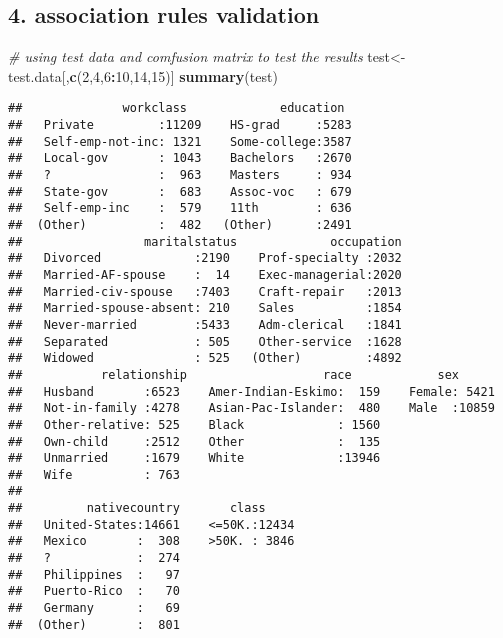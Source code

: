 \documentclass[]{article}
\newenvironment{Shaded}{\begin{snugshade}}{\end{snugshade}}
\newcommand{\KeywordTok}[1]{\textcolor[rgb]{0.13,0.29,0.53}{\textbf{#1}}}
\newcommand{\DecValTok}[1]{\textcolor[rgb]{0.00,0.00,0.81}{#1}}
\newcommand{\CommentTok}[1]{\textcolor[rgb]{0.56,0.35,0.01}{\textit{#1}}}
\newcommand{\OperatorTok}[1]{\textcolor[rgb]{0.81,0.36,0.00}{\textbf{#1}}}
\newcommand{\NormalTok}[1]{#1}
\begin{document}
\subsection{4. association rules
validation}\label{association-rules-validation}

\begin{Shaded}
\begin{Highlighting}[]
\CommentTok{# using test data and comfusion matrix to test the results }
\NormalTok{test<-test.data[,}\KeywordTok{c}\NormalTok{(}\DecValTok{2}\NormalTok{,}\DecValTok{4}\NormalTok{,}\DecValTok{6}\OperatorTok{:}\DecValTok{10}\NormalTok{,}\DecValTok{14}\NormalTok{,}\DecValTok{15}\NormalTok{)]}
\KeywordTok{summary}\NormalTok{(test)}
\end{Highlighting}
\end{Shaded}

\begin{verbatim}
##              workclass             education   
##   Private         :11209    HS-grad     :5283  
##   Self-emp-not-inc: 1321    Some-college:3587  
##   Local-gov       : 1043    Bachelors   :2670  
##   ?               :  963    Masters     : 934  
##   State-gov       :  683    Assoc-voc   : 679  
##   Self-emp-inc    :  579    11th        : 636  
##  (Other)          :  482   (Other)      :2491  
##                 maritalstatus             occupation  
##   Divorced             :2190    Prof-specialty :2032  
##   Married-AF-spouse    :  14    Exec-managerial:2020  
##   Married-civ-spouse   :7403    Craft-repair   :2013  
##   Married-spouse-absent: 210    Sales          :1854  
##   Never-married        :5433    Adm-clerical   :1841  
##   Separated            : 505    Other-service  :1628  
##   Widowed              : 525   (Other)         :4892  
##           relationship                   race            sex       
##   Husband       :6523    Amer-Indian-Eskimo:  159    Female: 5421  
##   Not-in-family :4278    Asian-Pac-Islander:  480    Male  :10859  
##   Other-relative: 525    Black             : 1560                  
##   Own-child     :2512    Other             :  135                  
##   Unmarried     :1679    White             :13946                  
##   Wife          : 763                                              
##                                                                    
##         nativecountry       class      
##   United-States:14661    <=50K.:12434  
##   Mexico       :  308    >50K. : 3846  
##   ?            :  274                  
##   Philippines  :   97                  
##   Puerto-Rico  :   70                  
##   Germany      :   69                  
##  (Other)       :  801
\end{verbatim}
\end{document}
